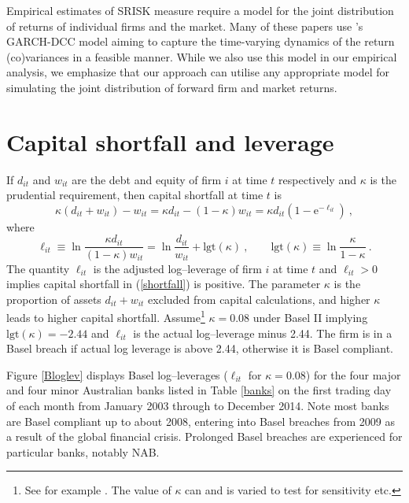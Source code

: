 \documentclass[12pt]{article}
\newcommand{\logit}{\mathrm{lgt}}
\newcommand{\e}{\mathrm{e}}
\newcommand{\eref}[1]{(\ref{#1})}
\newcommand{\fref}[1]{Figure \ref{#1}}
\newcommand{\tref}[1]{Table \ref{#1}}
\newcommand{\cq}{\ , \qquad}
\newcommand{\be}[1]{\begin{equation}\label{#1}}
\newcommand{\ee}{\end{equation}}
\begin{document}
Empirical estimates of SRISK measure require a model for the joint distribution of returns of individual firms and the market. Many of these papers use \cite{engle2002dynamic}'s GARCH-DCC model aiming to capture the time-varying dynamics of the return (co)variances in a feasible manner. While we also use this model in our empirical analysis, we emphasize that our approach can utilise any appropriate model for simulating the joint distribution of forward firm and market returns. 


\section{Capital shortfall and leverage}\label{capshort}

If $d_{it}$ and $w_{it}$ are the debt and equity of firm $i$ at time $t$ respectively and $\kappa$ is the prudential requirement,  then  capital shortfall at time $t$ is
\be{shortfall}
\kappa(d_{it}+w_{it}) - w_{it} = \kappa d_{it}  - (1-\kappa) w_{it} = \kappa d_{it}\left(1-\e^{-\ell_{it}}\right)\ ,
\ee
where
$$
\ell_{it} \equiv  \ln\frac{\kappa d_{it}}{(1-\kappa)w_{it}}= \ln\frac{d_{it}}{w_{it}}+\logit(\kappa) \cq \logit(\kappa)\equiv \ln \frac{\kappa}{1-\kappa} \ .
$$
The quantity $\ell_{it}$ is the adjusted log--leverage of firm $i$ at time $t$ and $\ell_{it}>0$ implies capital shortfall in \eref{shortfall} is positive. The parameter $\kappa$ is the proportion of assets $d_{it}+w_{it}$ excluded from capital calculations, and higher $\kappa$ leads to higher capital shortfall.
Assume\footnote{See for example \cite{brownlees2015}.   The value of $\kappa$ can and is varied to test for sensitivity etc.} $\kappa=0.08$ under Basel II implying $\logit(\kappa)=-2.44$ and  $\ell_{it}$ is the actual log--leverage minus 2.44.
The firm is in a Basel breach if actual  log leverage is above 2.44, otherwise it is Basel compliant.

\fref{Bloglev} displays Basel log--leverages ($\ell_{it}$ for $\kappa=0.08$) for the four major and four minor Australian banks listed in \tref{banks} on the first trading day of each month from January 2003  through to December 2014.  Note most banks are Basel compliant up to about 2008, entering into Basel breaches from 2009 as a result of the global financial crisis. Prolonged Basel breaches are experienced for particular banks, notably NAB.
\end{document}
